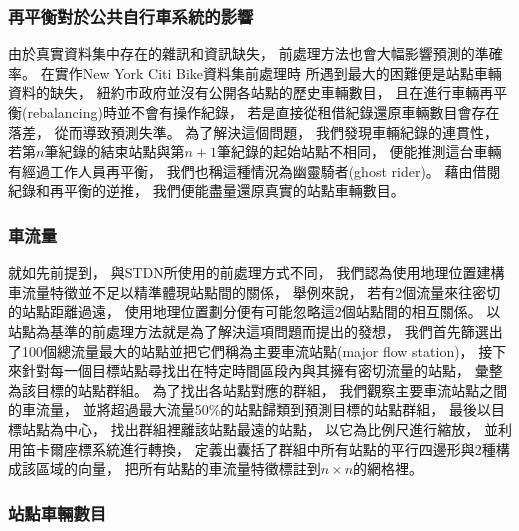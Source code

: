 \documentclass[a4paper,14pt]{extarticle}
\begin{document}
            \subsubsection{再平衡對於公共自行車系統的影響}

                由於真實資料集中存在的雜訊和資訊缺失，
                前處理方法也會大幅影響預測的準確率。
                在實作New York Citi Bike資料集前處理時
                所遇到最大的困難便是站點車輛資料的缺失，
                紐約市政府並沒有公開各站點的歷史車輛數目，
                且在進行車輛再平衡(rebalancing)時並不會有操作紀錄，
                若是直接從租借紀錄還原車輛數目會存在落差，
                從而導致預測失準。
                為了解決這個問題，
                我們發現車輛紀錄的連貫性，
                若第$n$筆紀錄的結束站點與第$n + 1$筆紀錄的起始站點不相同，
                便能推測這台車輛有經過工作人員再平衡，
                我們也稱這種情況為幽靈騎者(ghost rider)。
                藉由借閱紀錄和再平衡的逆推，
                我們便能盡量還原真實的站點車輛數目。

            \subsubsection{車流量}
                \label{subsec:flow}
                就如先前提到，
                與STDN所使用的前處理方式不同，
                我們認為使用地理位置建構車流量特徵並不足以精準體現站點間的關係，
                舉例來說，
                若有2個流量來往密切的站點距離過遠，
                使用地理位置劃分便有可能忽略這2個站點間的相互關係。
                以站點為基準的前處理方法就是為了解決這項問題而提出的發想，
                我們首先篩選出了100個總流量最大的站點並把它們稱為主要車流站點(major flow station)，
                接下來針對每一個目標站點尋找出在特定時間區段內與其擁有密切流量的站點，
                彙整為該目標的站點群組。
                為了找出各站點對應的群組，
                我們觀察主要車流站點之間的車流量，
                並將超過最大流量50\%的站點歸類到預測目標的站點群組，
                最後以目標站點為中心，
                找出群組裡離該站點最遠的站點，
                以它為比例尺進行縮放，
                並利用笛卡爾座標系統進行轉換，
                定義出囊括了群組中所有站點的平行四邊形與2種構成該區域的向量，
                把所有站點的車流量特徵標註到$n \times n$的網格裡。

            \subsubsection{站點車輛數目}
                
\end{document}
